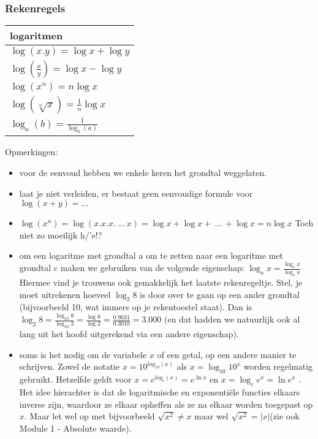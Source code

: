\subsubsection{Rekenregels}

\begin{tabular}{|l|}
\hline 
logaritmen\tabularnewline
\hline 
\hline 
${\displaystyle \log\left(x.y\right)=\log x+\log y}$\tabularnewline
\hline 
${\displaystyle \log\left(\frac{x}{y}\right)=\log x-\log y}$\tabularnewline
\hline 
${\displaystyle \log\left(x^{n}\right)=n\log x}$\tabularnewline
\hline 
${\displaystyle \log\left(\sqrt[n]{x}\right)=\frac{1}{n}\log x}$\tabularnewline
\hline 
${\displaystyle \log_{a}\left(b\right)=\frac{1}{\log_{b}\left(a\right)}}$\tabularnewline
\hline 
\end{tabular}\medskip{}


Opmerkingen:
\begin{itemize}
\item voor de eenvoud hebben we enkele keren het grondtal weggelaten. 
\item laat je niet verleiden, er bestaat geen eenvoudige formule voor ${\displaystyle \log\left(x+y\right)=\ldots}$
\item ${\displaystyle \log\left(x^{n}\right)=\log\left(x.x.x.\:\ldots\:x\right)=\log x+\log x+\:\ldots\:+\log x=n\log x}$
Toch niet zo moeilijk h/'e!?
\item om een logaritme met grondtal a om te zetten naar een logaritme met
grondtal c maken we gebruiken van de volgende eigenschap: ${\displaystyle \log_{a}x=\frac{\log_{c}x}{\log_{c}a}}$
Hiermee vind je trouwens ook gemakkelijk het laatste rekenregeltje.
Stel, je moet uitrekenen hoeveel ${\displaystyle \log_{2}8}$ is door
over te gaan op een ander grondtal (bijvoorbeeld 10, wat immers op
je rekentoestel staat). Dan is ${\displaystyle \log_{2}8=\frac{\log_{10}8}{\log_{10}2}=\frac{\log8}{\log2}=\frac{0.9031}{0.3010}=3.000}$
(en dat hadden we natuurlijk ook al lang uit het hoofd uitgerekend
via een andere eigenschap).
\item soms is het nodig om de variabele $x$ of een getal, op een andere
manier te schrijven. Zowel de notatie ${\displaystyle x=10^{log_{10}(x)}}$
als ${\displaystyle x=\log_{10}10^{x}}$ worden regelmatig gebruikt.
Hetzelfde geldt voor ${\displaystyle x=e^{log_{e}(x)}=e^{\ln x}}$
en ${\displaystyle x=\log_{e}e^{x}=\ln e^{x}}$ . Het idee hierachter
is dat de logaritmische en exponenti\"ele functies elkaars inverse zijn,
waardoor ze elkaar opheffen als ze na elkaar worden toegepast op $x$.
Maar let wel op met bijvoorbeeld ${\displaystyle \sqrt{x^{2}}\neq x}$
maar wel ${\displaystyle \sqrt{x^{2}}=\left|x\right|}$(zie ook Module
1 - Absolute waarde).
\end{itemize}

